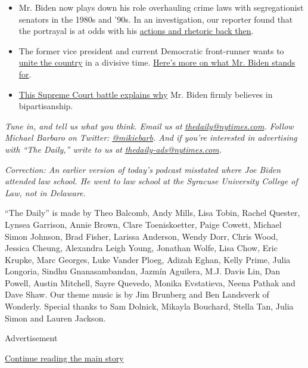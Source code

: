 \begin{itemize}
\item
  Mr. Biden now plays down his role overhauling crime laws with
  segregationist senators in the 1980s and '90s. In an investigation,
  our reporter found that the portrayal is at odds with his
  \href{https://www.nytimes.com/2019/06/25/us/joe-biden-crime-laws.html}{actions
  and rhetoric back then}.
\item
  The former vice president and current Democratic front-runner wants to
  \href{https://www.nytimes.com/2019/07/23/magazine/joe-biden-2020.html}{unite
  the country} in a divisive time.
  \href{https://www.nytimes.com/interactive/2020/us/elections/joe-biden.html}{Here's
  more on what Mr. Biden stands for}.
\item
  \href{https://www.nytimes.com/2019/09/07/us/politics/joe-biden-bork-supreme-court.html}{This
  Supreme Court battle explains why} Mr. Biden firmly believes in
  bipartisanship.
\end{itemize}

\emph{Tune in, and tell us what you think. Email us at}
\href{mailto:thedaily@nytimes.com}{\emph{thedaily@nytimes.com}}\emph{.
Follow Michael Barbaro on Twitter:}
\href{https://twitter.com/mikiebarb}{\emph{@mikiebarb}}\emph{. And if
you're interested in advertising with ``The Daily,'' write to us at}
\href{mailto:thedaily-ads@nytimes.com}{\emph{thedaily-ads@nytimes.com}}\emph{.}

\emph{Correction: An earlier version of today's podcast misstated where
Joe Biden attended law school. He went to law school at the Syracuse
University College of Law, not in Delaware.}

``The Daily'' is made by Theo Balcomb, Andy Mills, Lisa Tobin, Rachel
Quester, Lynsea Garrison, Annie Brown, Clare Toeniskoetter, Paige
Cowett, Michael Simon Johnson, Brad Fisher, Larissa Anderson, Wendy
Dorr, Chris Wood, Jessica Cheung, Alexandra Leigh Young, Jonathan Wolfe,
Lisa Chow, Eric Krupke, Marc Georges, Luke Vander Ploeg, Adizah Eghan,
Kelly Prime, Julia Longoria, Sindhu Gnanasambandan, Jazmín Aguilera,
M.J. Davis Lin, Dan Powell, Austin Mitchell, Sayre Quevedo, Monika
Evstatieva, Neena Pathak and Dave Shaw. Our theme music is by Jim
Brunberg and Ben Landsverk of Wonderly. Special thanks to Sam Dolnick,
Mikayla Bouchard, Stella Tan, Julia Simon and Lauren Jackson.

Advertisement

\protect\hyperlink{after-bottom}{Continue reading the main story}

